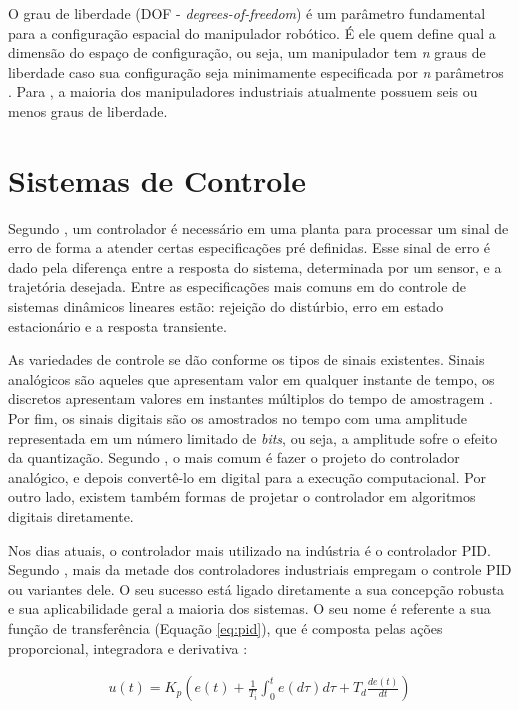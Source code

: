 O grau de liberdade (DOF - \textit{degrees-of-freedom}) é um parâmetro fundamental para 
a configuração espacial do manipulador robótico. É ele quem define qual a dimensão do 
espaço de configuração, ou seja, um manipulador tem \textit{n} graus de liberdade caso sua 
configuração seja minimamente especificada por \textit{n} parâmetros \cite{Spong}. Para 
, a maioria dos manipuladores industriais atualmente possuem seis 
ou menos graus de liberdade.

\section{Sistemas de Controle}

Segundo , um controlador é necessário em uma planta 
para processar um sinal de erro de forma a atender certas especificações pré 
definidas. Esse sinal de erro é dado pela diferença entre a resposta do sistema, 
determinada por um sensor, e a trajetória desejada. Entre as especificações mais 
comuns em do controle de sistemas dinâmicos lineares estão: rejeição do 
distúrbio, erro em estado estacionário e a resposta transiente.

As variedades de controle se dão conforme os tipos de sinais existentes. Sinais 
analógicos são aqueles que apresentam valor em qualquer instante de tempo, os 
discretos apresentam valores em instantes múltiplos do tempo de amostragem 
\cite{Castrucci}. Por fim, os sinais digitais são os amostrados no tempo com uma 
amplitude representada em um número limitado de \textit{bits}, ou seja, a amplitude 
sofre o efeito da quantização. Segundo , o mais comum é
fazer o projeto do controlador analógico, e depois convertê-lo em digital para a 
execução computacional. Por outro lado, existem também formas de projetar o
controlador em algoritmos digitais diretamente.

Nos dias atuais, o controlador mais utilizado na indústria é o controlador PID. 
Segundo , mais da metade dos controladores industriais empregam
o controle PID ou variantes dele. O seu sucesso está ligado diretamente a sua 
concepção robusta e sua aplicabilidade geral a maioria dos sistemas. O seu nome 
é referente a sua função de transferência (Equação \ref{eq:pid}), que é composta 
pelas ações proporcional, integradora e derivativa \cite{Castrucci}:

\begin{equation}
  \begin{gathered}
    u(t) = K_p\left(e(t)+\frac{1}{T_i}\int_{0}^{t}e(d\tau)d\tau+T_d\frac{de(t)}{dt}\right)
  \end{gathered}
  \label{eq:pid}
\end{equation}

